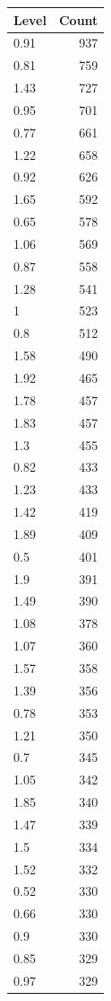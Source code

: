 \begin{table}[ht]
\centering
\begin{tabular}{lr}
  \hline
Level & Count \\ 
  \hline
0.91 & 937 \\ 
  0.81 & 759 \\ 
  1.43 & 727 \\ 
  0.95 & 701 \\ 
  0.77 & 661 \\ 
  1.22 & 658 \\ 
  0.92 & 626 \\ 
  1.65 & 592 \\ 
  0.65 & 578 \\ 
  1.06 & 569 \\ 
  0.87 & 558 \\ 
  1.28 & 541 \\ 
  1 & 523 \\ 
  0.8 & 512 \\ 
  1.58 & 490 \\ 
  1.92 & 465 \\ 
  1.78 & 457 \\ 
  1.83 & 457 \\ 
  1.3 & 455 \\ 
  0.82 & 433 \\ 
  1.23 & 433 \\ 
  1.42 & 419 \\ 
  1.89 & 409 \\ 
  0.5 & 401 \\ 
  1.9 & 391 \\ 
  1.49 & 390 \\ 
  1.08 & 378 \\ 
  1.07 & 360 \\ 
  1.57 & 358 \\ 
  1.39 & 356 \\ 
  0.78 & 353 \\ 
  1.21 & 350 \\ 
  0.7 & 345 \\ 
  1.05 & 342 \\ 
  1.85 & 340 \\ 
  1.47 & 339 \\ 
  1.5 & 334 \\ 
  1.52 & 332 \\ 
  0.52 & 330 \\ 
  0.66 & 330 \\ 
  0.9 & 330 \\ 
  0.85 & 329 \\ 
  0.97 & 329 \\ 

\end{tabular}
\end{table}
